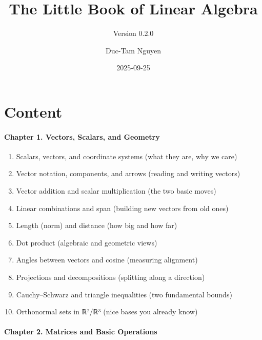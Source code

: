 \documentclass[
  letterpaper,
  DIV=11,
  numbers=noendperiod]{scrreprt}
\title{The Little Book of Linear Algebra}
\subtitle{Version 0.2.0}
\author{Duc-Tam Nguyen}
\date{2025-09-25}
\providecommand{\tightlist}{%
  \setlength{\itemsep}{0pt}\setlength{\parskip}{0pt}}
\renewcommand*\contentsname{Table of contents}
\newcommand\contentsname{Table of contents}
\begin{document}
\maketitle

\renewcommand*\contentsname{Table of contents}
{
\hypersetup{linkcolor=}
\setcounter{tocdepth}{2}
\tableofcontents
}


\chapter{Content}\label{content}

\subsubsection{Chapter 1. Vectors, Scalars, and
Geometry}\label{chapter-1.-vectors-scalars-and-geometry}

\begin{enumerate}
\def\labelenumi{\arabic{enumi}.}
\tightlist
\item
  Scalars, vectors, and coordinate systems (what they are, why we care)
\item
  Vector notation, components, and arrows (reading and writing vectors)
\item
  Vector addition and scalar multiplication (the two basic moves)
\item
  Linear combinations and span (building new vectors from old ones)
\item
  Length (norm) and distance (how big and how far)
\item
  Dot product (algebraic and geometric views)
\item
  Angles between vectors and cosine (measuring alignment)
\item
  Projections and decompositions (splitting along a direction)
\item
  Cauchy--Schwarz and triangle inequalities (two fundamental bounds)
\item
  Orthonormal sets in ℝ²/ℝ³ (nice bases you already know)
\end{enumerate}

\subsubsection{Chapter 2. Matrices and Basic
Operations}\label{chapter-2.-matrices-and-basic-operations}
\end{document}
